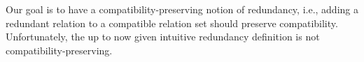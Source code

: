 


Our goal is to have a compatibility-preserving notion of redundancy, i.e., adding a redundant relation to a compatible relation set should preserve compatibility.
Unfortunately, the up to now given intuitive redundancy definition is not compatibility-preserving. %

